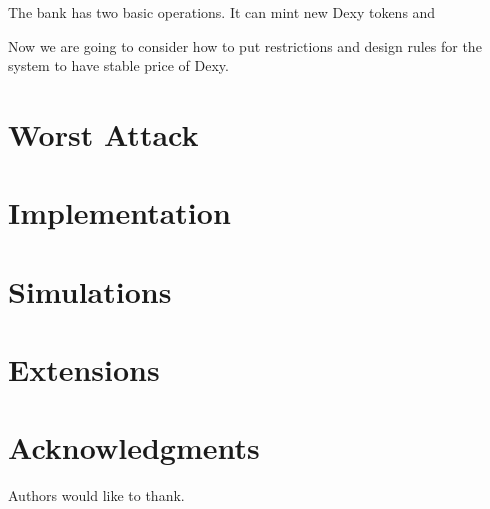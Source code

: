 \documentclass[conference]{IEEEtran}   %
\newcommand{\dx}{Dexy}
\begin{document}
The bank has two basic operations. It can mint new \dx{} tokens and 

Now we are going to consider how to put restrictions and design rules for the system to have stable price of \dx{}. 

\section{Worst Attack}

\section{Implementation}

\section{Simulations}

\section{Extensions}


%
%
%
%
%
%
%
%
%

\section*{Acknowledgments}

Authors would like to thank.





%
\end{document}
